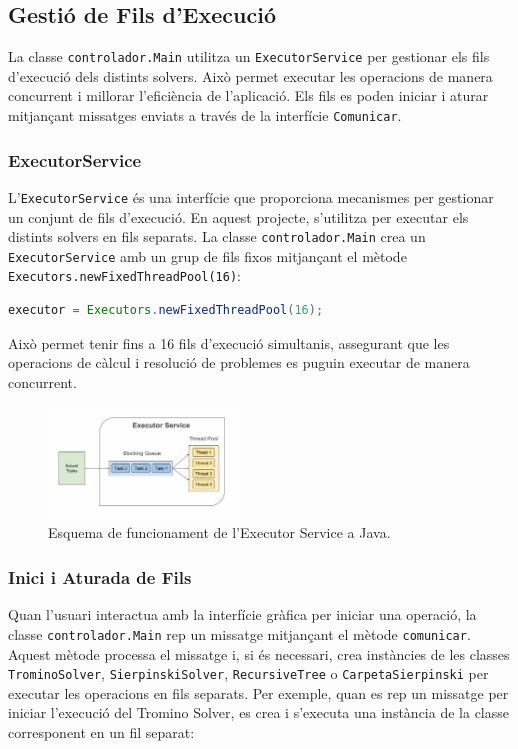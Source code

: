 \documentclass{ieeetj}
\begin{document}
\subsection{Gestió de Fils d'Execució}
La classe \texttt{controlador.Main} utilitza un \texttt{ExecutorService} per gestionar els fils d'execució dels distints solvers. Això permet executar les operacions de manera concurrent i millorar l'eficiència de l'aplicació. Els fils es poden iniciar i aturar mitjançant missatges enviats a través de la interfície \texttt{Comunicar}.
\subsubsection{ExecutorService}
L'\texttt{ExecutorService} és una interfície que proporciona mecanismes per gestionar un conjunt de fils d'execució. En aquest projecte, s'utilitza per executar els distints solvers en fils separats\cite{oracleExecutorService}. La classe \texttt{controlador.Main} crea un \texttt{ExecutorService} amb un grup de fils fixos mitjançant el mètode \texttt{Executors.newFixedThreadPool(16)}:
\begin{lstlisting}[language=Java, basicstyle=\ttfamily\small]
executor = Executors.newFixedThreadPool(16);
\end{lstlisting}
Això permet tenir fins a 16 fils d'execució simultanis, assegurant que les operacions de càlcul i resolució de problemes es puguin executar de manera concurrent.

\begin{figure}[htbp]
\centerline{\includegraphics[width=0.45\textwidth]{png/executorService.png}}
\caption{Esquema de funcionament de l'Executor Service a Java.}
\label{fig:exeServ}
\end{figure}

\subsubsection{Inici i Aturada de Fils}
Quan l'usuari interactua amb la interfície gràfica per iniciar una operació, la classe \texttt{controlador.Main} rep un missatge mitjançant el mètode \texttt{comunicar}. Aquest mètode processa el missatge i, si és necessari, crea instàncies de les classes \texttt{TrominoSolver}, \texttt{SierpinskiSolver}, \texttt{RecursiveTree} o \texttt{CarpetaSierpinski} per executar les operacions en fils separats. Per exemple, quan es rep un missatge per iniciar l'execució del Tromino Solver, es crea i s'executa una instància de la classe corresponent en un fil separat:
\end{document}
